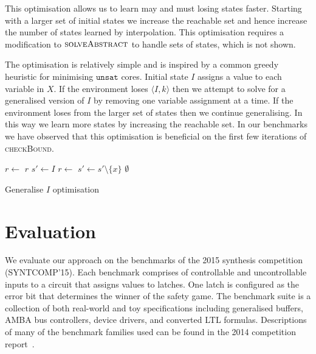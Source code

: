 \documentclass{llncs}
\begin{document}
This optimisation allows us to learn may and must losing states faster.
Starting with a larger set of initial states we increase the reachable set and
hence increase the number of states learned by interpolation. This optimisation
requires a modification to $\textsc{solveAbstract}$ to handle sets of states,
which is not shown.

The optimisation is relatively simple and is inspired by a common greedy
heuristic for minimising $\texttt{unsat}$ cores. Initial state $I$ assigns a value to
each variable in $X$. If the environment loses $\langle I, k
\rangle$ then we attempt to solve for a generalised version of $I$ by removing
one variable assignment at a time. If the environment loses from the larger set of
states then we continue generalising. In this way we learn more
states by increasing the reachable set. In our benchmarks we have observed that
this optimisation is beneficial on the first few iterations of
\textsc{checkBound}.

\begin{algorithm}
    \begin{algorithmic}
            \State $r \gets $ 
             \Return $r$ \EndIIf
            \State $s' \gets I$
            \State $r \gets$  
                 $s' \gets s' \setminus \{x\}$ \EndIIf {}
            \EndFor
            \State \Return $\emptyset$
        \EndFunction
    \end{algorithmic}
    \caption{Generalise $I$ optimisation}
    \label{alg:opt1}
\end{algorithm}

\section{Evaluation}

We evaluate our approach on the benchmarks of the 2015 synthesis competition
(SYNTCOMP'15). Each benchmark comprises of controllable and uncontrollable
inputs to a circuit that assigns values to latches. One latch is configured as
the error bit that determines the winner of the safety game. The benchmark
suite is a collection of both real-world and toy specifications including
generalised buffers, AMBA bus controllers, device drivers, and converted LTL
formulas.  Descriptions of many of the benchmark families used can be found in
the 2014 competition report~\cite{jacobs2015}. 
\end{document}
